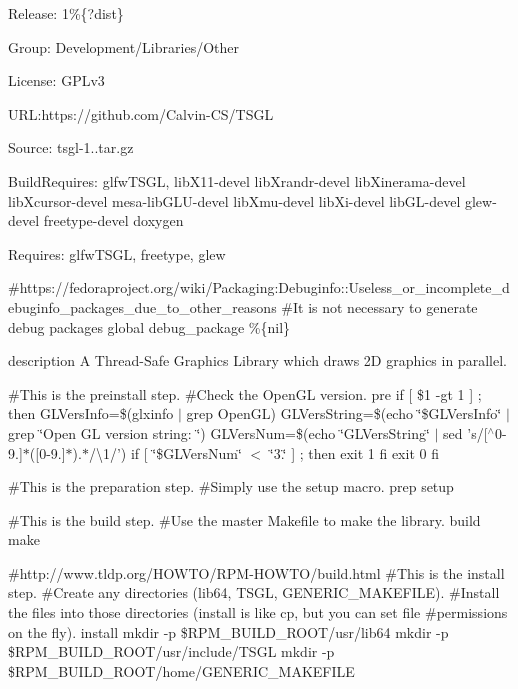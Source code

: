 Release\-: 1\%\{?dist\}

Group\-: Development/\-Libraries/\-Other

License\-: G\-P\-Lv3

U\-R\-L\-:https\-://github.com/\-Calvin-\/\-C\-S/\-T\-S\-G\-L

Source\-: tsgl-\/1..\-tar.\-gz

Build\-Requires\-: glfw\-T\-S\-G\-L, lib\-X11-\/devel lib\-Xrandr-\/devel lib\-Xinerama-\/devel lib\-Xcursor-\/devel mesa-\/lib\-G\-L\-U-\/devel lib\-Xmu-\/devel lib\-Xi-\/devel lib\-G\-L-\/devel glew-\/devel freetype-\/devel doxygen

Requires\-: glfw\-T\-S\-G\-L, freetype, glew

\#https\-://fedoraproject.org/wiki/\-Packaging\-:Debuginfo\-::\-Useless\-\_\-or\-\_\-incomplete\-\_\-debuginfo\-\_\-packages\-\_\-due\-\_\-to\-\_\-other\-\_\-reasons \#\-It is not necessary to generate debug packages global debug\-\_\-package \%\{nil\}

description A Thread-\/\-Safe Graphics Library which draws 2\-D graphics in parallel.

\#\-This is the preinstall step. \#\-Check the Open\-G\-L version. pre if \mbox{[} \$1 -\/gt 1 \mbox{]} ; then G\-L\-Vers\-Info=\$(glxinfo $\vert$ grep Open\-G\-L) G\-L\-Vers\-String=\$(echo \char`\"{}\$\-G\-L\-Vers\-Info\char`\"{} $\vert$ grep \char`\"{}\-Open G\-L version string\-: \char`\"{}) G\-L\-Vers\-Num=\$(echo \char`\"{}\-G\-L\-Vers\-String\char`\"{} $\vert$ sed 's/\mbox{[}$^\wedge$0-\/9.\mbox{]}$\ast$(\mbox{[}0-\/9.\mbox{]}$\ast$).$\ast$/\textbackslash{}1/') if \mbox{[} \char`\"{}\$\-G\-L\-Vers\-Num\char`\"{} $<$ \char`\"{}3.\char`\"{} \mbox{]} ; then exit 1 fi exit 0 fi

\#\-This is the preparation step. \#\-Simply use the setup macro. prep setup

\#\-This is the build step. \#\-Use the master Makefile to make the library. build make

\#http\-://www.tldp.\-org/\-H\-O\-W\-T\-O/\-R\-P\-M-\/\-H\-O\-W\-T\-O/build.html \#\-This is the install step. \#\-Create any directories (lib64, T\-S\-G\-L, G\-E\-N\-E\-R\-I\-C\-\_\-\-M\-A\-K\-E\-F\-I\-L\-E). \#\-Install the files into those directories (install is like cp, but you can set file \#permissions on the fly). install mkdir -\/p \$\-R\-P\-M\-\_\-\-B\-U\-I\-L\-D\-\_\-\-R\-O\-O\-T/usr/lib64 mkdir -\/p \$\-R\-P\-M\-\_\-\-B\-U\-I\-L\-D\-\_\-\-R\-O\-O\-T/usr/include/\-T\-S\-G\-L mkdir -\/p \$\-R\-P\-M\-\_\-\-B\-U\-I\-L\-D\-\_\-\-R\-O\-O\-T/home/\-G\-E\-N\-E\-R\-I\-C\-\_\-\-M\-A\-K\-E\-F\-I\-L\-E

